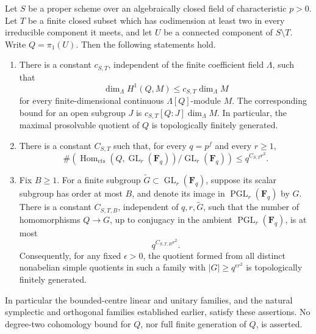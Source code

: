 \begin{corollary}
\label{D:nonnormal-finite-puncture-quantitative-transfer}
Let \(S\) be a proper scheme over an algebraically closed field
of characteristic \(p>0\).  Let \(T\) be a finite closed subset
which has codimension at least two in every irreducible component
it meets, and let \(U\) be a connected component of \(S\setminus T\).
Write \(Q=\pi_1(U)\).  Then the following statements hold.
\begin{enumerate}
\item There is a constant \(c_{S,T}\), independent of the finite
coefficient field \(\Lambda\), such that
\[
 \dim_\Lambda H^1(Q,M)\leq c_{S,T}\dim_\Lambda M
\]
for every finite-dimensional continuous \(\Lambda[Q]\)-module \(M\).
The corresponding bound for an open subgroup \(J\) is
\(c_{S,T}[Q:J]\dim_\Lambda M\).
In particular, the maximal prosolvable quotient of \(Q\) is
topologically finitely generated.
\item There is a constant \(C_{S,T}\) such that, for every \(q=p^f\)
and every \(r\geq1\),
\[
 \#\left(\operatorname{Hom}_{\mathrm{cts}}(Q,\operatorname{GL}_r(\mathbf F_q))
          /\operatorname{GL}_r(\mathbf F_q)\right)
 \leq q^{C_{S,T}r^2}.
 \tag{FP1}
\]
\item Fix \(B\geq1\).  For a finite subgroup
\(\widetilde G\subset\operatorname{GL}_r(\mathbf F_q)\), suppose
its scalar subgroup has order at most \(B\), and denote its image
in \(\operatorname{PGL}_r(\mathbf F_q)\) by \(G\).
There is a constant \(C_{S,T,B}\), independent of \(q,r,\widetilde G\),
such that the number of homomorphisms \(Q\to G\), up to conjugacy
in the ambient \(\operatorname{PGL}_r(\mathbf F_q)\), is at most
\[
                         q^{C_{S,T,B}r^2}.                \tag{FP2}
\]
Consequently, for any fixed \(\epsilon>0\), the quotient formed
from all distinct nonabelian simple quotients in such a family
with \(|G|\geq q^{\epsilon r^2}\) is topologically finitely generated.
\end{enumerate}
In particular the bounded-centre linear and unitary families,
and the natural symplectic and orthogonal families established
earlier, satisfy these assertions.  No degree-two cohomology
bound for \(Q\), nor full finite generation of \(Q\), is asserted.
\end{corollary}

